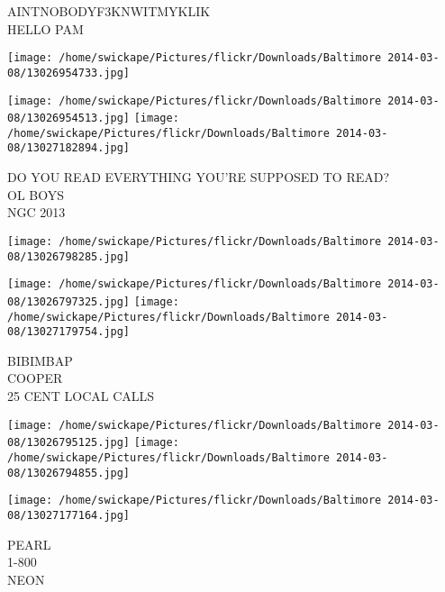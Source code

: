 \documentclass[10pt,letterpaper]{article}
\begin{document}
AINTNOBODYF3KNWITMYKLIK\\
HELLO PAM\\
\pagebreak

\texttt{[image: /home/swickape/Pictures/flickr/Downloads/Baltimore 2014-03-08/13026954733.jpg]}

\vspace{0.25in}
\texttt{[image: /home/swickape/Pictures/flickr/Downloads/Baltimore 2014-03-08/13026954513.jpg]}
\texttt{[image: /home/swickape/Pictures/flickr/Downloads/Baltimore 2014-03-08/13027182894.jpg]}

DO YOU READ EVERYTHING YOU'RE SUPPOSED TO READ?\\
OL BOYS\\
NGC 2013\\
\pagebreak

\texttt{[image: /home/swickape/Pictures/flickr/Downloads/Baltimore 2014-03-08/13026798285.jpg]}

\vspace{0.25in}
\texttt{[image: /home/swickape/Pictures/flickr/Downloads/Baltimore 2014-03-08/13026797325.jpg]}
\texttt{[image: /home/swickape/Pictures/flickr/Downloads/Baltimore 2014-03-08/13027179754.jpg]}

BIBIMBAP\\
COOPER\\
25 CENT LOCAL CALLS\\
\pagebreak

\texttt{[image: /home/swickape/Pictures/flickr/Downloads/Baltimore 2014-03-08/13026795125.jpg]}
\texttt{[image: /home/swickape/Pictures/flickr/Downloads/Baltimore 2014-03-08/13026794855.jpg]}

\texttt{[image: /home/swickape/Pictures/flickr/Downloads/Baltimore 2014-03-08/13027177164.jpg]}

PEARL\\
1{-}800\\
NEON\\
\pagebreak
\end{document}
